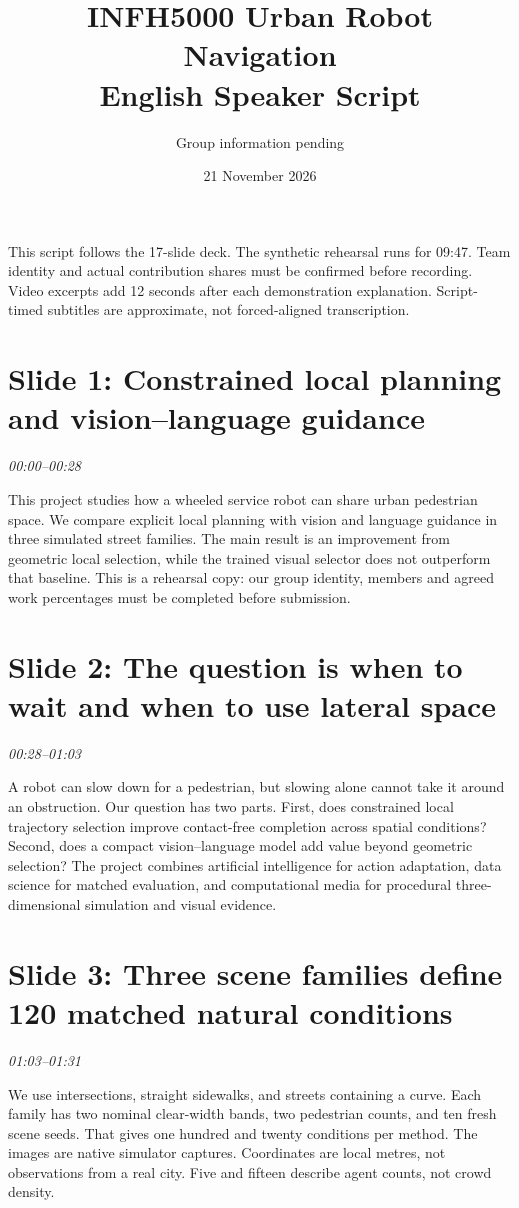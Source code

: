 \documentclass[a4paper,11pt]{article}
\title{INFH5000 Urban Robot Navigation\\English Speaker Script}\author{Group information pending}\date{21 November 2026}
\begin{document}
\maketitle
This script follows the 17-slide deck. The synthetic rehearsal runs for 09:47. Team identity and actual contribution shares must be confirmed before recording. Video excerpts add 12 seconds after each demonstration explanation. Script-timed subtitles are approximate, not forced-aligned transcription.
\section*{Slide 1: Constrained local planning and vision--language guidance}
\textit{00:00--00:28}

This project studies how a wheeled service robot can share urban pedestrian space. We compare explicit local planning with vision and language guidance in three simulated street families. The main result is an improvement from geometric local selection, while the trained visual selector does not outperform that baseline. This is a rehearsal copy: our group identity, members and agreed work percentages must be completed before submission.

\section*{Slide 2: The question is when to wait and when to use lateral space}
\textit{00:28--01:03}

A robot can slow down for a pedestrian, but slowing alone cannot take it around an obstruction. Our question has two parts. First, does constrained local trajectory selection improve contact-free completion across spatial conditions? Second, does a compact vision--language model add value beyond geometric selection? The project combines artificial intelligence for action adaptation, data science for matched evaluation, and computational media for procedural three-dimensional simulation and visual evidence.

\section*{Slide 3: Three scene families define 120 matched natural conditions}
\textit{01:03--01:31}

We use intersections, straight sidewalks, and streets containing a curve. Each family has two nominal clear-width bands, two pedestrian counts, and ten fresh scene seeds. That gives one hundred and twenty conditions per method. The images are native simulator captures. Coordinates are local metres, not observations from a real city. Five and fifteen describe agent counts, not crowd density.
\end{document}
